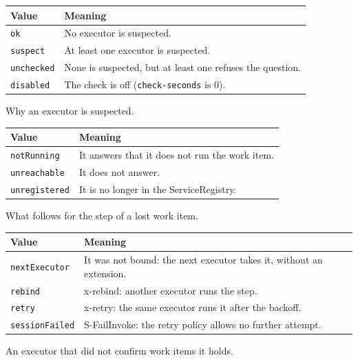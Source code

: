 \documentclass[a4paper]{arrowhead}
\begin{document}
{\small
\begin{longtable}{|p{3.9cm}|p{11.9cm}|}

\hline
\rowcolor{gray!33} Value & Meaning \\ \hline
\endhead
\texttt{ok} & No executor is suspected. \\ \hline
\texttt{suspect} & At least one executor is suspected. \\ \hline
\texttt{unchecked} & None is suspected, but at least one refuses the question. \\ \hline
\texttt{disabled} & The check is off (\texttt{check-seconds} is 0). \\ \hline
\end{longtable}
}

Why an executor is suspected.

{\small
\begin{longtable}{|p{3.9cm}|p{11.9cm}|}

\hline
\rowcolor{gray!33} Value & Meaning \\ \hline
\endhead
\texttt{notRunning} & It answers that it does not run the work item. \\ \hline
\texttt{unreachable} & It does not answer. \\ \hline
\texttt{unregistered} & It is no longer in the ServiceRegistry. \\ \hline
\end{longtable}
}

What follows for the step of a lost work item.

{\small
\begin{longtable}{|p{3.9cm}|p{11.9cm}|}

\hline
\rowcolor{gray!33} Value & Meaning \\ \hline
\endhead
\texttt{nextExecutor} & It was not bound: the next executor takes it, without an extension. \\ \hline
\texttt{rebind} & x-rebind: another executor runs the step. \\ \hline
\texttt{retry} & x-retry: the same executor runs it after the backoff. \\ \hline
\texttt{sessionFailed} & S-FailInvoke: the retry policy allows no further attempt. \\ \hline
\end{longtable}
}

An executor that did not confirm work items it holds.
\end{document}
